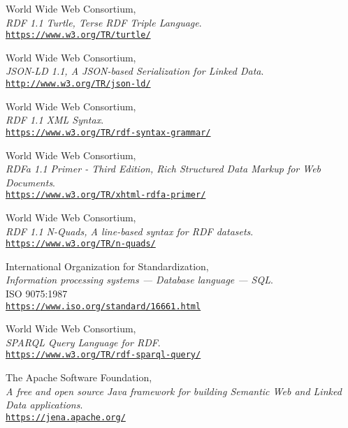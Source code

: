 \begin{thebibliography}{X}
            World Wide Web Consortium,
            \\ \textit{RDF 1.1 Turtle, Terse RDF Triple Language}.
            \\ \texttt{\url{https://www.w3.org/TR/turtle/}}
            
            World Wide Web Consortium,
            \\ \textit{JSON-LD 1.1, A JSON-based Serialization for Linked Data}.
            \\ \texttt{\url{http://www.w3.org/TR/json-ld/}}
        
            World Wide Web Consortium,
            \\ \textit{RDF 1.1 XML Syntax}.
            \\ \texttt{\url{https://www.w3.org/TR/rdf-syntax-grammar/}}
            
            World Wide Web Consortium,
            \\ \textit{RDFa 1.1 Primer - Third Edition, Rich Structured Data Markup for Web Documents}.
            \\ \texttt{\url{https://www.w3.org/TR/xhtml-rdfa-primer/}}
            
            World Wide Web Consortium,
            \\ \textit{RDF 1.1 N-Quads, A line-based syntax for RDF datasets}.
            \\ \texttt{\url{https://www.w3.org/TR/n-quads/}}
            
            International Organization for Standardization,
            \\ \textit{Information processing systems — Database language — SQL}.\\
            ISO 9075:1987
            \\ \texttt{\url{https://www.iso.org/standard/16661.html}}
            
            World Wide Web Consortium,
            \\ \textit{SPARQL Query Language for RDF}.
            \\ \texttt{\url{https://www.w3.org/TR/rdf-sparql-query/}}
            
            The Apache Software Foundation,
            \\ \textit{A free and open source Java framework for building Semantic Web and Linked Data applications}.
            \\ \texttt{\url{https://jena.apache.org/}}
            

\end{thebibliography}
